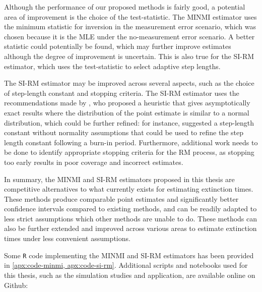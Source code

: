 Although the performance of our proposed methods is fairly good, a potential area of improvement is the choice of the test-statistic. The MINMI estimator uses the minimum statistic for inversion in the measurement error scenario, which was chosen because it is the MLE under the no-measurement error scenario. A better statistic could potentially be found, which may further improve estimates although the degree of improvement is uncertain. This is also true for the SI-RM estimator, which uses the test-statistic to select adaptive step lengths.

The SI-RM estimator may be improved across several aspects, such as the choice of step-length constant and stopping criteria. The SI-RM estimator uses the recommendations made by \citet{Garthwaite1992}, who proposed a heuristic that gives asymptotically exact results where the distribution of the point estimate is similar to a normal distribution, which could be further refined: for instance, \citet{LlyodBotev2015} suggested a step-length constant without normality assumptions that could be used to refine the step length constant following a burn-in period. Furthermore, additional work needs to be done to identify appropriate stopping criteria for the RM process, as stopping too early results in poor coverage and incorrect estimates.

In summary, the MINMI and SI-RM estimators proposed in this thesis are competitive alternatives to what currently exists for estimating extinction times. These methods produce comparable point estimates and significantly better confidence intervals compared to existing methods, and can be readily adapted to less strict assumptions which other methods are unable to do. These methods can also be further extended and improved across various areas to estimate extinction times under less convenient assumptions.

Some \texttt{R} code implementing the MINMI and SI-RM estimators has been provided in \autoref{apx:code-minmi, apx:code-si-rm}. Additional scripts and notebooks used for this thesis, such as the simulation studies and application, are available online on Github: 